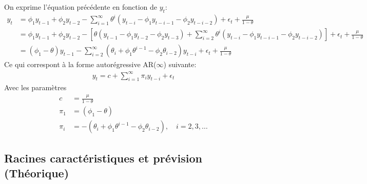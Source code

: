 \documentclass{article}
\begin{document}
\begin{enumerate}
  On exprime l'équation précédente en fonction de $y_t$:
  \begin{align*}
    y_t &= \phi_1 y_{t-1} + \phi_2 y_{t-2} - \sum_{i=1}^{\infty} \theta^i \left(y_{t-i} - \phi_1 y_{t-i-1} - \phi_2 y_{t-i-2} \right) + \epsilon_t + \frac{\mu}{1-\theta} \\
    &= \phi_1 y_{t-1} + \phi_2 y_{t-2} - \left[\theta\left(y_{t-1}-\phi_1 y_{t-2} - \phi_2 y_{t-3} \right) + \sum_{i=2}^{\infty} \theta^i \left(y_{t-i} - \phi_1 y_{t-i-1} - \phi_2 y_{t-i-2} \right)\right] + \epsilon_t + \frac{\mu}{1-\theta}  \\
    &= (\phi_1 - \theta) y_{t-1} - \sum_{i=2}^{\infty} \left(\theta_i+\phi_1\theta^{i-1} - \phi_2\theta_{i-2}\right) y_{t-i} + \epsilon_t + \frac{\mu}{1-\theta}
  \end{align*}
  Ce qui correspont à la forme autorégressive AR($\infty$) suivante:
  \begin{align*}
    y_t = c + \sum_{i=1}^{\infty} \pi_i y_{t-i} + \epsilon_t
  \end{align*}
  Avec les paramètres
  \begin{align*}
    c &= \frac{\mu}{1-\theta} \\
    \pi_1 &= (\phi_1 - \theta) \\
    \pi_i &= -\left(\theta_i+\phi_1\theta^{i-1} - \phi_2\theta_{i-2}\right),\quad i=2,3,\ldots
  \end{align*}
  
\end{enumerate}

\clearpage
\subsection{Racines caractéristiques et prévision (Théorique)}
\end{document}
